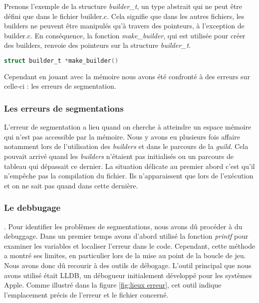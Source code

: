 \documentclass{article}
\begin{document}
Prenons l'exemple de la structure \emph{builder\_t}, un type abstrait qui ne peut être défini que dans le fichier builder.c. Cela signifie que dans les autres fichiers, les builders ne peuvent être manipulés qu'à travers des pointeurs, à l'exception de builder.c. En conséquence, la fonction \emph{make\_builder}, qui est utilisée pour créer des builders, renvoie des pointeurs sur la structure \emph{builder\_t}.

\begin{tcolorbox}[colback=gray!10,colframe=white!75!black]
\begin{lstlisting}[language=C, caption={La fonction \text{make\_builder}},label={lst:exemple0-c}]
struct builder_t *make_builder() 
\end{lstlisting}
\end{tcolorbox}

Cependant en jouant avec la mémoire nous avons été confronté à des erreurs sur celle-ci : les erreurs de segmentation. 

\subsubsection{Les erreurs de segmentations}

\hspace{1em} L'erreur de segmentation a lieu quand on cherche à atteindre un espace mémoire qui n'est pas accessible par la mémoire. Nous y avons eu plusieurs fois affaire notamment lors de l'utilisation des \emph{builders} et dans le parcours de la \emph{guild}. Cela pouvait arrivé quand les \emph{builders} n'étaient pas initialisés ou un parcours de tableau qui dépassait ce dernier. La situation délicate au premier abord c'est qu'il n'empêche pas la compilation du fichier. Ils n'apparaissent que lors de l'exécution et on ne sait pas quand dans cette dernière.  

\subsubsection{Le debbugage}

\vspace{1em}

 

\hspace{1em}. Pour identifier les problèmes de segmentations, nous avons dû procéder à du debuggage. Dans un premier temps avons d'abord utilisé la fonction \emph{printf}  pour examiner les variables et localiser l'erreur dans le code. Cependant, cette méthode a montré ses limites, en particulier lors de la mise au point de la boucle de jeu. Nous avons donc dû recourir à des outils de débogage. L'outil principal que nous avons utilisé était LLDB, un débogueur initialement développé pour les systèmes Apple. Comme illustré dans la figure \ref{fig:lieux erreur}, cet outil indique l'emplacement précis de l'erreur et le fichier concerné.
\end{document}
